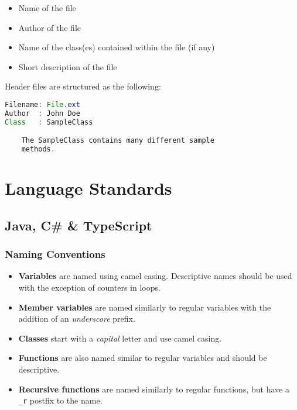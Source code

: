 \documentclass{article}
\begin{document}
    \begin{itemize}
        \item Name of the file
        \item Author of the file
        \item Name of the class(es) contained within the file (if any)
        \item Short description of the file
    \end{itemize}

    Header files are structured as the following:

    \begin{lstlisting}[language=Java]
Filename: File.ext
Author  : John Doe
Class   : SampleClass

    The SampleClass contains many different sample
    methods.
    \end{lstlisting}

    \newpage

    \section{Language Standards}
    \label{sec:ls}

    \subsection{Java, C\# \& TypeScript}
    \label{sec:ls-java}

    \subsubsection{Naming Conventions}
    \label{sec:ls-java-nc}

    \begin{itemize}
        \item \textbf{Variables} are named using camel casing. Descriptive names
                should be used with the exception of counters in loops.
        \item \textbf{Member variables} are named similarly to regular variables
                with the addition of an \textit{underscore} prefix.
        \item \textbf{Classes} start with a \textit{capital} letter and use
                camel casing.
        \item \textbf{Functions} are also named similar to regular variables and
                should be descriptive.
        \item \textbf{Recursive functions} are named similarly to regular
                functions, but have a \texttt{\_r} postfix to the name.
    \end{itemize}
\end{document}
